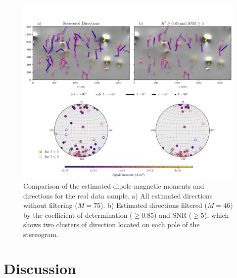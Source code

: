\begin{figure}[tb!]
\centering
\includegraphics[width=1\linewidth]{figures/real-data-stereograms.png}
\caption{
Comparison of the estimated dipole magnetic moments and directions for the real data sample.
a) All estimated directions without filtering ($M=75$). b) Estimated directions filtered ($M=46$) by the coefficient of determination ($\geq 0.85$) and SNR ($\geq 5$), which shows two clusters of direction located on each pole of the stereogram.
}
\label{real-data-stereograms}
\end{figure}

\section{Discussion}

\DIFdelbegin \subsection{}
\addtocounter{subsection}{-1}%

